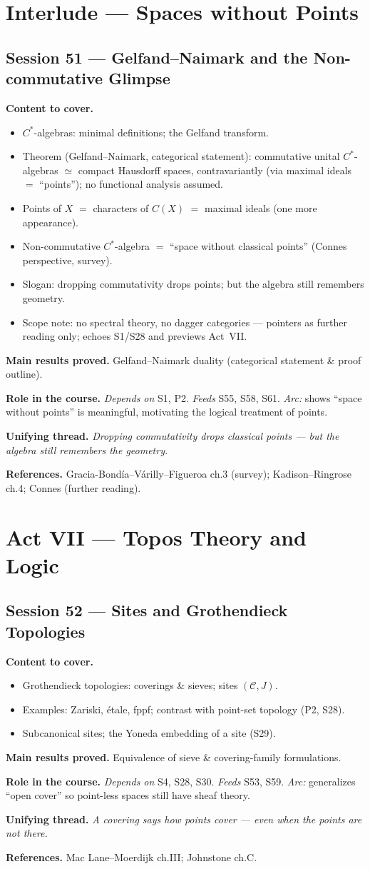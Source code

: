 \documentclass[11pt,a4paper]{article}
\newcommand{\sess}[2]{\subsection[#1. #2]{Session #1 --- #2}}
\newcommand{\chead}{\par\smallskip\noindent\textbf{Content to cover.}}
\newcommand{\proved}[1]{\par\smallskip\noindent\textbf{Main results proved.} #1}
\newcommand{\role}[1]{\par\smallskip\noindent\textbf{Role in the course.} #1}
\newcommand{\thread}[1]{\par\smallskip\noindent\textbf{Unifying thread.} \textit{#1}}
\newcommand{\srefs}[1]{\par\smallskip\noindent\textbf{References.} #1}
\begin{document}
	\section{Interlude --- Spaces without Points}
	
	\sess{51}{Gelfand--Naimark and the Non-commutative Glimpse}
	\chead
	\begin{itemize}
		\item $C^*$-algebras: minimal definitions; the Gelfand transform.
		\item Theorem (Gelfand--Naimark, categorical statement): commutative unital $C^*$-algebras $\simeq$ compact Hausdorff spaces, contravariantly (via maximal ideals $=$ ``points''); no functional analysis assumed.
		\item Points of $X$ $=$ characters of $C(X)$ $=$ maximal ideals (one more appearance).
		\item Non-commutative $C^*$-algebra $=$ ``space without classical points'' (Connes perspective, survey).
		\item Slogan: dropping commutativity drops points; but the algebra still remembers geometry.
		\item Scope note: no spectral theory, no dagger categories --- pointers as further reading only; echoes S1/S28 and previews Act~VII.
	\end{itemize}
	\proved{Gelfand--Naimark duality (categorical statement \& proof outline).}
	\role{\emph{Depends on} S1, P2. \emph{Feeds} S55, S58, S61. \emph{Arc:} shows ``space without points'' is meaningful, motivating the logical treatment of points.}
	\thread{Dropping commutativity drops classical points --- but the algebra still remembers the geometry.}
	\srefs{Gracia-Bond\'ia--V\'arilly--Figueroa ch.3 (survey); Kadison--Ringrose ch.4; Connes (further reading).}
	
	\section{Act VII --- Topos Theory and Logic}
	
	\sess{52}{Sites and Grothendieck Topologies}
	\chead
	\begin{itemize}
		\item Grothendieck topologies: coverings \& sieves; sites $(\mathcal C,J)$.
		\item Examples: Zariski, \'etale, fppf; contrast with point-set topology (P2, S28).
		\item Subcanonical sites; the Yoneda embedding of a site (S29).
	\end{itemize}
	\proved{Equivalence of sieve \& covering-family formulations.}
	\role{\emph{Depends on} S4, S28, S30. \emph{Feeds} S53, S59. \emph{Arc:} generalizes ``open cover'' so point-less spaces still have sheaf theory.}
	\thread{A covering says how points cover --- even when the points are not there.}
	\srefs{Mac Lane--Moerdijk ch.III; Johnstone ch.C.}
	
\end{document}
